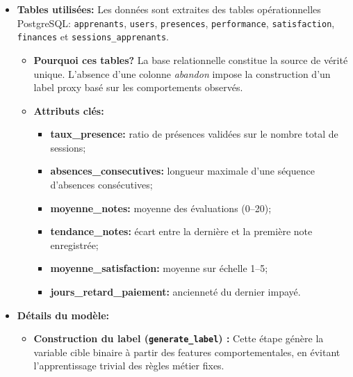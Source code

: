 \begin{itemize}[label=\textbullet]
    \item \textbf{Tables utilisées:} Les données sont extraites des tables 
opérationnelles PostgreSQL: \texttt{apprenants}, \texttt{users}, 
\texttt{presences}, \texttt{performance}, \texttt{satisfaction}, 
\texttt{finances} et \texttt{sessions\_apprenants}.
     \begin{itemize}
        \item \textbf{Pourquoi ces tables?} La base relationnelle constitue la source 
de vérité unique. L'absence d'une colonne \textit{abandon} impose la 
construction d'un label proxy basé sur les comportements observés.
     
     \item \textbf{Attributs clés:}
\begin{itemize}[label=\textbullet]
    \item \textbf{taux\_presence:} ratio de présences validées sur le 
    nombre total de sessions;
    \item \textbf{absences\_consecutives:} longueur maximale d'une 
    séquence d'absences consécutives;
    \item \textbf{moyenne\_notes:} moyenne des évaluations (0--20);
    \item \textbf{tendance\_notes:} écart entre la dernière et la 
    première note enregistrée;
    \item \textbf{moyenne\_satisfaction:} moyenne sur échelle 1--5;
    \item \textbf{jours\_retard\_paiement:} ancienneté du dernier impayé.
     \end{itemize}
\end{itemize}
\item \textbf{Détails du modèle:}

\begin{itemize}[label=\textbullet]

    \item \textbf{Construction du label (\texttt{generate\_label}) :} 
    Cette étape génère la variable cible binaire à partir des features 
    comportementales, en évitant l'apprentissage trivial des règles 
    métier fixes.


\end{itemize}
\end{itemize}
